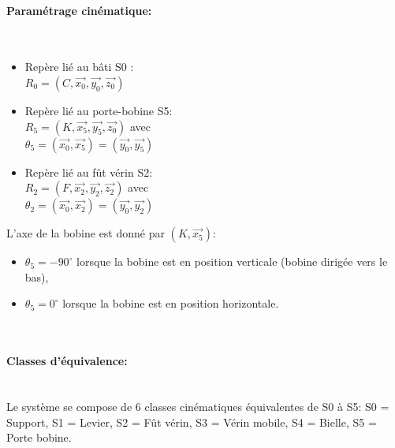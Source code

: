 \paragraph{Paramétrage cinématique:} ~\
\begin{itemize}
 \item Repère lié au bâti S0 : \\
$R_0=(C,\overrightarrow{x_0},\overrightarrow{y_0},\overrightarrow{z_0})$
 \item Repère lié au porte-bobine S5: \\   
$R_5=(K,\overrightarrow{x_5},\overrightarrow{y_5},\overrightarrow{z_0})$
 avec \\ $\theta_5=(\overrightarrow{x_0},\overrightarrow{x_5})=(\overrightarrow{y_0},\overrightarrow{y_5})$
 \item Repère lié au fût vérin S2: \\
$R_2=(F,\overrightarrow{x_2},\overrightarrow{y_2},\overrightarrow{z_2})$ 
avec \\ $\theta_{2}=(\overrightarrow{x_0},\overrightarrow{x_2})=(\overrightarrow{y_0},\overrightarrow{y_2})$
\end{itemize}

L'axe de la bobine est donné par $(K,\overrightarrow{x_5})$:
\begin{itemize}
  \item $\theta_5=-90^{\circ}$ lorsque la bobine est en position verticale (bobine dirigée vers le bas),
  \item $\theta_5=0^{\circ}$ lorsque la bobine est en position horizontale.
\end{itemize}
~\

\paragraph{Classes d'équivalence:} ~\ \\
Le système se compose de 6 classes cinématiques équivalentes de S0 à S5:
S0 = Support, S1 = Levier, S2 = Fût vérin, S3 = Vérin mobile, S4 = Bielle, S5 = Porte bobine.

~\

